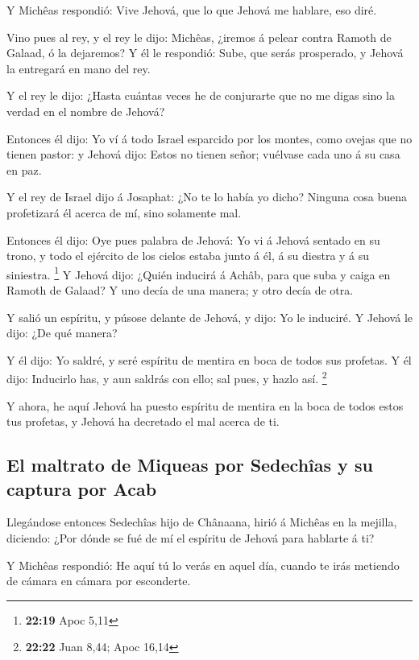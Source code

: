  Y Michêas respondió: Vive Jehová, que lo que Jehová me
hablare, eso diré.

 Vino pues al rey, y el rey le dijo: Michêas, ¿iremos á
pelear contra Ramoth de Galaad, ó la dejaremos? Y él le respondió: Sube,
que serás prosperado, y Jehová la entregará en mano del rey.

 Y el rey le dijo: ¿Hasta cuántas veces he de conjurarte
que no me digas sino la verdad en el nombre de Jehová?

 Entonces él dijo: Yo ví á todo Israel esparcido por los
montes, como ovejas que no tienen pastor: y Jehová dijo: Estos no tienen
señor; vuélvase cada uno á su casa en paz.

 Y el rey de Israel dijo á Josaphat: ¿No te lo había yo
dicho? Ninguna cosa buena profetizará él acerca de mí, sino solamente
mal.

 Entonces él dijo: Oye pues palabra de Jehová: Yo vi á
Jehová sentado en su trono, y todo el ejército de los cielos estaba
junto á él, á su diestra y á su siniestra. \footnote{\textbf{22:19} Apoc
  5,11}  Y Jehová dijo: ¿Quién inducirá á Achâb, para que
suba y caiga en Ramoth de Galaad? Y uno decía de una manera; y otro
decía de otra.

 Y salió un espíritu, y púsose delante de Jehová, y dijo:
Yo le induciré. Y Jehová le dijo: ¿De qué manera?

 Y él dijo: Yo saldré, y seré espíritu de mentira en boca
de todos sus profetas. Y él dijo: Inducirlo has, y aun saldrás con ello;
sal pues, y hazlo así. \footnote{\textbf{22:22} Juan 8,44; Apoc 16,14}

 Y ahora, he aquí Jehová ha puesto espíritu de mentira en
la boca de todos estos tus profetas, y Jehová ha decretado el mal acerca
de ti.

\hypertarget{el-maltrato-de-miqueas-por-sedechuxeeas-y-su-captura-por-acab}{%
\subsection{El maltrato de Miqueas por Sedechîas y su captura por
Acab}\label{el-maltrato-de-miqueas-por-sedechuxeeas-y-su-captura-por-acab}}

 Llegándose entonces Sedechîas hijo de Chânaana, hirió á
Michêas en la mejilla, diciendo: ¿Por dónde se fué de mí el espíritu de
Jehová para hablarte á ti?

 Y Michêas respondió: He aquí tú lo verás en aquel día,
cuando te irás metiendo de cámara en cámara por esconderte.

